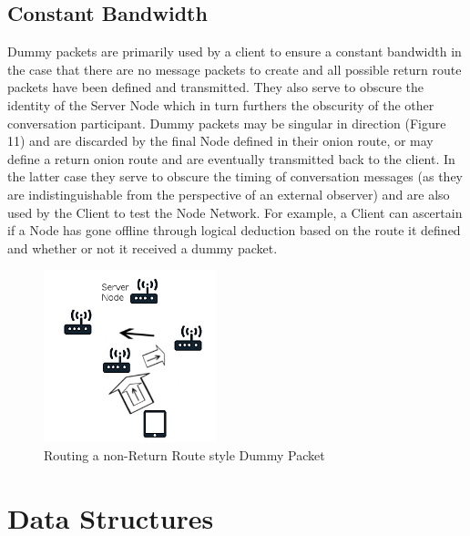 \documentclass{article}
\begin{document}
\subsection{Constant Bandwidth}
Dummy packets are primarily used by a client to ensure a constant bandwidth in the case that there are no message packets to create and all possible return route
packets have been defined and transmitted. They also serve to obscure the identity of the Server Node which in turn furthers the obscurity of the other conversation participant.
Dummy packets may be singular in direction (Figure 11) and are discarded by the final Node defined in their onion route, or may define a return onion route and are
eventually transmitted back to the client. In the latter case they serve to obscure the timing of conversation messages (as they are indistinguishable from the perspective
of an external observer) and are also used by the Client to test the Node Network. For example, a Client can ascertain if a Node has gone offline through logical deduction
based on the route it defined and whether or not it received a dummy packet.
\begin{figure}[h]
	\centering
  	\includegraphics[width=5cm,height=5cm,keepaspectratio]{img/DummyPacket.png}
	\caption{Routing a non-Return Route style Dummy Packet}
\end{figure}

\newpage

\section{Data Structures}
\end{document}
